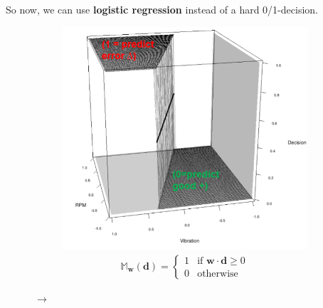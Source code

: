 So now, we can use \textbf{logistic regression} instead of a hard 0/1-decision.
\begin{figure}[H]
  \centering
  \begin{subfigure}{0.4\textwidth}
    \centering
    \vspace*{0.5cm}

    \includegraphics[width=1\textwidth]{assets/regression/lr__01.png}
    \begin{align*}
      \mathbb{M}_\mathbf{w}(\mathbf{d}) = 
        \left\{\begin{array}{ll} 
          1& \text{if }\mathbf{w}\cdot\mathbf{d}\geq0\\
          0& \text{otherwise}
        \end{array}\right.
    \end{align*}
  \end{subfigure}\hspace*{0.05\textwidth}$\rightarrow$\hspace*{0.05\textwidth}
  \begin{subfigure}{0.4\textwidth}
    \centering

\end{subfigure}
\end{figure}
